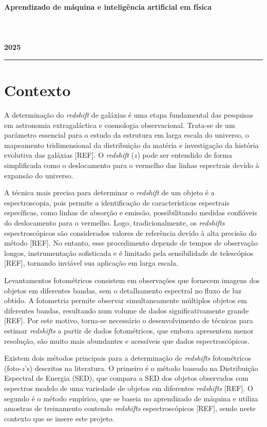 
\begin{center}
    {\Large \textbf{Aprendizado de máquina e inteligência artificial em física} \hspace{0.5cm}}\\
    \vspace{0.3 cm}
	\vspace{0.3 cm}
	\\
        \\
        \\
	\vspace{0.3 cm}
	\textbf{2025}
\end{center}    
\rule{\textwidth}{0.5pt}

\section{Contexto}\label{sec:contexto}

A determinação do \textit{redshift} de galáxias é uma etapa fundamental das pesquisas em astronomia extragaláctica e cosmologia observacional. Trata-se de um parâmetro essencial para o estudo da estrutura em larga escala do universo, o mapeamento tridimensional da distribuição da matéria e investigação da história evolutiva das galáxias [REF]. O \textit{redshift} ($z$) pode ser entendido de forma simplificada como o deslocamento para o vermelho das linhas espectrais devido à expansão do universo. 

A técnica mais precisa para determinar o \textit{redshift} de um objeto é a espectroscopia, pois permite a identificação de características espectrais específicas, como linhas de absorção e emissão, possibilitando medidas confiáveis do deslocamento para o vermelho. Logo, tradicionalmente, os \textit{redshifts} espectroscópicos são considerados valores de referência devido à alta precisão do método [REF]. No entanto, esse procedimento depende de tempos de observação longos, instrumentação sofisticada e é limitado pela sensibilidade de telescópios [REF], tornando inviável sua aplicação em larga escala.

Levantamentos fotométricos consistem em observações que fornecem imagens dos objetos em diferentes bandas, sem o detalhamento espectral no fluxo de luz obtido. A fotometria permite observar simultaneamente múltiplos objetos em diferentes bandas, resultando num volume de dados significativamente grande [REF]. Por este motivo, torna-se necessário o desenvolvimento de técnicas para estimar \textit{redshifts} a partir de dados fotométricos, que embora apresentem menor resolução, são muito mais abundantes e acessíveis que dados espectroscópicos.

Existem dois métodos principais para a determinação de \textit{redshifts} fotométricos (foto-$z$'s) descritos na literatura. O primeiro é o método baseado na Distribuição Espectral de Energia (SED), que compara a SED dos objetos observados com espectros modelo de uma variedade de objetos em diferentes \textit{redshifts} [REF]. O segundo é o método empírico, que se baseia no aprendizado de máquina e utiliza amostras de treinamento contendo \textit{redshifts} espectroscópicos [REF], sendo neste contexto que se insere este projeto.

